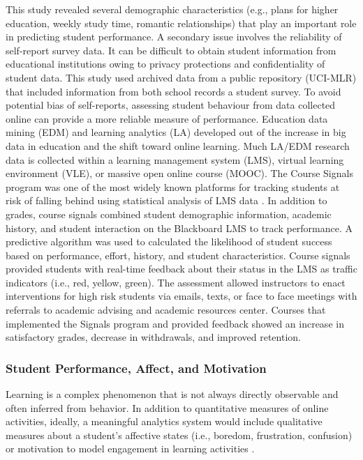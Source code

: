 \documentclass[sigconf]{acmart}
\begin{document}
This study revealed several demographic characteristics (e.g., plans for 
higher education, weekly study time, romantic relationships) that play an
important role in predicting student performance. A secondary issue involves 
the reliability of self-report survey data. It can be difficult to obtain 
student information from educational institutions owing to privacy protections 
and confidentiality of student data. This study used archived data from a 
public repository (UCI-MLR) that included information from both school records 
a student survey. To avoid potential bias of self-reports, assessing student 
behaviour from data collected online can provide a more reliable measure of
performance. Education data mining (EDM) and learning analytics (LA) developed 
out of the increase in big data in education and the shift toward online 
learning. Much LA/EDM research data is collected within a learning management 
system (LMS), virtual learning environment (VLE), or massive open online 
course (MOOC). The Course Signals program was one of the most widely known 
platforms for tracking students at risk of falling behind using statistical 
analysis of LMS data \cite{arnoldPistilli12}. In addition to grades, course
signals combined student demographic information, academic history, and student 
interaction on the Blackboard LMS to track performance. A predictive algorithm 
was used to calculated the likelihood of student success based on performance, 
effort, history, and student characteristics. Course signals provided students 
with real-time feedback about their status in the LMS as traffic indicators 
(i.e., red, yellow, green). The assessment allowed instructors to enact 
interventions for high risk students via emails, texts, or face to face 
meetings with referrals to academic advising and academic resources center.
Courses that implemented the Signals program and provided feedback showed an 
increase in satisfactory grades, decrease in withdrawals, and improved retention. 


\subsubsection{Student Performance, Affect, and Motivation}

Learning is a complex phenomenon that is not always directly observable and 
often inferred from behavior. In addition to quantitative measures of online
activities, ideally, a meaningful analytics system would include qualitative
measures about a student's affective states (i.e., boredom, frustration, 
confusion) or motivation to model engagement in learning activities
\cite{baker14, pardos14}.
\end{document}
